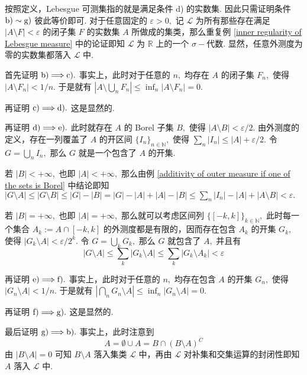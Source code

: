 \documentclass[12pt, a4paper, oneside]{book}
\numberwithin{figure}{section}
\theoremstyle{definition}
\begin{document}
按照定义，Lebesgue 可测集指的就是满足条件 d) 的实数集. 因此只需证明条件 $\rm b)\sim g)$ 彼此等价即可. 对于任意固定的 $\varepsilon>0,$ 记 $\mathcal L$ 为所有那些存在满足 $|A\setminus F|<\varepsilon$ 的闭子集 $F$ 的实数集 $A$ 所做成的集类，那么重复例 \ref{inner regularity of Lebesgue measure} 中的论证即知 $\mathcal L$ 为 $\mathbb R$ 上的一个
$\sigma-$代数. 显然，任意外测度为零的实数集都落入 $\mathcal L$ 中.

首先证明 $\rm b)\Longrightarrow c).$ 事实上，此时对于任意的 $n,$ 均存在 $A$ 的闭子集 $F_n,$ 使得 $|A\setminus F_n|<1/n.$ 于是就有 
$|A\setminus\bigcup_n F_n|\leq \inf_n |A\setminus F_n|=0.$

再证明 $\rm c)\Longrightarrow d).$ 这是显然的.

再证明 $\rm d)\Longrightarrow e).$ 此时就存在 $A$ 的 Borel 子集 $B,$ 使得 $|A\setminus B|<\varepsilon/2.$ 由外测度的定义，存在一列覆盖了 $A$ 的开区间 $\{I_n\}_{n\in\mathbb N},$ 使得
$\sum_n |I_n|\leq |A|+\varepsilon/2.$ 令 $G=\bigcup_n I_n,$ 那么 $G$ 就是一个包含了 $A$ 的开集. 

若 $|B|<+\infty,$ 也即 $|A|<+\infty,$ 那么由例 \ref{additivity of outer measure if one of the sets is Borel} 中结论即知
$|G\setminus A|\leq |G\setminus B|\leq |G|-|B|=|G|-|A|+|A|-|B|\leq \sum_n |I_n|-|A|+|A\setminus B|<\varepsilon.$

若 $|B|=+\infty,$ 也即 $|A|=+\infty,$ 那么就可以考虑区间列 $\{[-k,k]\}_{k\in\mathbb N},$ 此时每一个集合 $A_k:=A\cap[-k,k]$ 的外测度都是有限的，因而存在包含 $A_k$ 的开集 $G_k,$ 使得 
$|G_k\setminus A|<\varepsilon/2^k.$ 令 $G=\bigcup_k G_k,$ 那么 $G$ 就包含了 $A,$ 并且有
\begin{equation}
    \left|G\setminus A\right|\leq\sum_k |G_k\setminus A|\leq \sum_k |G_k\setminus A_k|<\varepsilon
\end{equation}

再证明 $\rm e)\Longrightarrow f).$ 事实上，此时对于任意的 $n,$ 均存在包含 $A$ 的开集 $G_n,$ 使得 $|G_n\setminus A|<1/n.$ 于是就有 
$|\bigcap_n G_n\setminus A|\leq \inf_n |G_n\setminus A|=0.$

再证明 $\rm f)\Longrightarrow g).$ 这是显然的.

最后证明 $\rm g)\Longrightarrow b).$ 事实上，此时注意到 
\begin{equation}
    A = \emptyset\cup A=B\cap(B\setminus A)^C
\end{equation}
由 $|B\setminus A|=0$ 可知 $B\setminus A$ 落入集类 $\mathcal L$ 中，再由 $\mathcal L$ 对补集和交集运算的封闭性即知 $A$ 落入 $\mathcal L$ 中.
\end{document}
